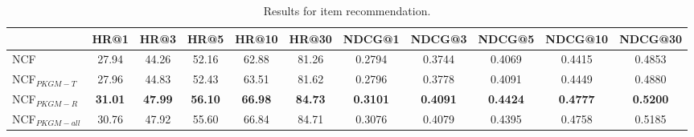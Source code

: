 \begin{table*}[!hbpt]
    \centering
    \caption{Results for item recommendation.}
    \begin{tabular}{l|c|c|c|c|c|c|c|c|c|c}
    \toprule
         & HR@1 & HR@3 & HR@5 & HR@10 & HR@30 & NDCG@1 & NDCG@3 & NDCG@5 &NDCG@10 & NDCG@30\\
        \midrule
        NCF  & 27.94 & 44.26 & 52.16 & 62.88 & 81.26 & 0.2794 & 0.3744 & 0.4069 & 0.4415 & 0.4853 \\
        \midrule
        NCF$_{PKGM-T}$ & 27.96 & 44.83 & 52.43 & 63.51 & 81.62 & 0.2796 & 0.3778 & 0.4091 & 0.4449 & 0.4880\\
        NCF$_{PKGM-R}$ & \textbf{31.01} & \textbf{47.99} & \textbf{56.10} & \textbf{66.98} & \textbf{84.73} & \textbf{0.3101} & \textbf{0.4091} & \textbf{0.4424} & \textbf{0.4777} & \textbf{0.5200}\\
        NCF$_{PKGM-all}$ & 30.76 & 47.92 & 55.60 & 66.84 & 84.71 & 0.3076 & 0.4079 & 0.4395 & 0.4758 & 0.5185 \\
        \bottomrule
    \end{tabular}
    \label{tab:res-recommendation}
\end{table*}

